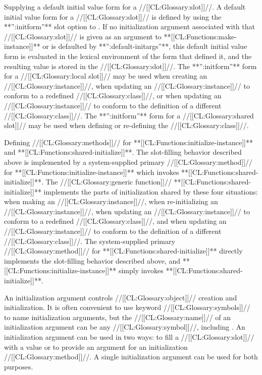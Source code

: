 \itemitem{\bull} Supplying a default initial value form for a //[[CL:Glossary:slot]]//.  
A default initial value form for a //[[CL:Glossary:slot]]// is defined by using the 
**'':initform''** slot option to .  If no initialization
argument associated with that //[[CL:Glossary:slot]]// is given as an argument to 
**[[CL:Functions:make-instance]]** or is defaulted by **'':default-initargs''**, this
default initial value form is evaluated in the lexical environment of
the  form that defined it, and the resulting value is
stored in the //[[CL:Glossary:slot]]//.  The **'':initform''** form for a
//[[CL:Glossary:local slot]]// may be used when creating an //[[CL:Glossary:instance]]//, when 
updating an //[[CL:Glossary:instance]]// to conform to a redefined //[[CL:Glossary:class]]//, 
or when updating an //[[CL:Glossary:instance]]// to conform to the definition of a
different //[[CL:Glossary:class]]//. The **'':initform''** form for a
//[[CL:Glossary:shared slot]]// may be used when defining or re-defining the //[[CL:Glossary:class]]//.
                                                                       
\itemitem{\bull} 
Defining //[[CL:Glossary:methods]]// for **[[CL:Functions:initialize-instance]]** and
**[[CL:Functions:shared-initialize]]**.  The slot-filling behavior described above is
implemented by a system-supplied primary //[[CL:Glossary:method]]// for
**[[CL:Functions:initialize-instance]]** which invokes **[[CL:Functions:shared-initialize]]**. The
//[[CL:Glossary:generic function]]// **[[CL:Functions:shared-initialize]]** implements the parts of
initialization shared by these four situations: when making an //[[CL:Glossary:instance]]//, 
when re-initializing an //[[CL:Glossary:instance]]//, when updating an //[[CL:Glossary:instance]]//
to conform to a redefined //[[CL:Glossary:class]]//, and when updating an //[[CL:Glossary:instance]]// 
to conform to the definition of a different //[[CL:Glossary:class]]//. The system-supplied
primary //[[CL:Glossary:method]]// for **[[CL:Functions:shared-initialize]]** directly implements the
slot-filling behavior described above, and **[[CL:Functions:initialize-instance]]**
simply invokes **[[CL:Functions:shared-initialize]]**.

\endlist


An initialization argument controls //[[CL:Glossary:object]]// creation and
initialization.  It is often convenient to use keyword //[[CL:Glossary:symbols]]//
to name initialization arguments, but the //[[CL:Glossary:name]]// of an
initialization argument can be any //[[CL:Glossary:symbol]]//, including \nil.  An
initialization argument can be used in two ways: to fill a //[[CL:Glossary:slot]]//
with a value or to provide an argument for an initialization
//[[CL:Glossary:method]]//.  A single initialization argument can be used for both
purposes.

